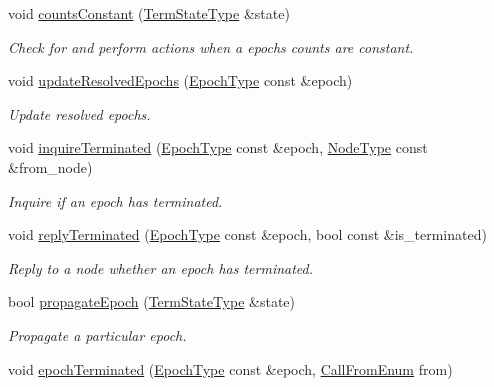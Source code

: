 \begin{DoxyCompactItemize}
void \hyperlink{structvt_1_1term_1_1_termination_detector_a9460b5236e34a5baa344b0ac814ce3c9}{counts\+Constant} (\hyperlink{structvt_1_1term_1_1_term_action_ae4c635b69751d887666814700ed64d65}{Term\+State\+Type} \&state)
\begin{DoxyCompactList}\small\item\em Check for and perform actions when a epoch\textquotesingle{}s counts are constant. \end{DoxyCompactList}\item 
void \hyperlink{structvt_1_1term_1_1_termination_detector_a7637035e3f3c0f898d8dc79bbc2d8bf4}{update\+Resolved\+Epochs} (\hyperlink{namespacevt_a985a5adf291c34a3ca263b3378388236}{Epoch\+Type} const \&epoch)
\begin{DoxyCompactList}\small\item\em Update resolved epochs. \end{DoxyCompactList}\item 
void \hyperlink{structvt_1_1term_1_1_termination_detector_a8a6c9a639b67a774e15c98d4b9d80166}{inquire\+Terminated} (\hyperlink{namespacevt_a985a5adf291c34a3ca263b3378388236}{Epoch\+Type} const \&epoch, \hyperlink{namespacevt_a866da9d0efc19c0a1ce79e9e492f47e2}{Node\+Type} const \&from\+\_\+node)
\begin{DoxyCompactList}\small\item\em Inquire if an epoch has terminated. \end{DoxyCompactList}\item 
void \hyperlink{structvt_1_1term_1_1_termination_detector_a4ea359dfd9c7cbd1c8dc96f5dff78ed1}{reply\+Terminated} (\hyperlink{namespacevt_a985a5adf291c34a3ca263b3378388236}{Epoch\+Type} const \&epoch, bool const \&is\+\_\+terminated)
\begin{DoxyCompactList}\small\item\em Reply to a node whether an epoch has terminated. \end{DoxyCompactList}\item 
bool \hyperlink{structvt_1_1term_1_1_termination_detector_a8f39f31278d42572260d09fb4c72aceb}{propagate\+Epoch} (\hyperlink{structvt_1_1term_1_1_term_action_ae4c635b69751d887666814700ed64d65}{Term\+State\+Type} \&state)
\begin{DoxyCompactList}\small\item\em Propagate a particular epoch. \end{DoxyCompactList}\item 
void \hyperlink{structvt_1_1term_1_1_termination_detector_a54a16b81d1c0717a4a7cd1adff5b146e}{epoch\+Terminated} (\hyperlink{namespacevt_a985a5adf291c34a3ca263b3378388236}{Epoch\+Type} const \&epoch, \hyperlink{structvt_1_1term_1_1_termination_detector_a4f3ede9a87f39d86e85f92b36a6c6a30}{Call\+From\+Enum} from)

\end{DoxyCompactItemize}
